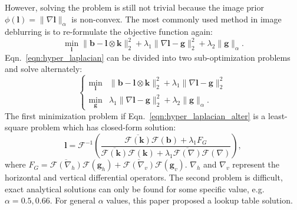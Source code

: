 \documentclass[journal, onecolumn, 10pt]{IEEEtran}
\begin{document}
However, solving the problem is still not trivial because the image prior $\phi(\mathbf{l}) = \|\nabla \mathbf{l}\|_{\alpha}$ is non-convex. The most commonly used method in image deblurring is to re-formulate the objective function again:
\begin{equation}
\min_{\mathbf{l}} \| \mathbf{b} - \mathbf{l} \otimes \mathbf{k} \|_2^2 + \lambda_1 \|\nabla \mathbf{l} - \mathbf{g}\|_2^2 + \lambda_2\|\mathbf{g}\|_{\alpha}.
\label{eqn:hyper_laplacian}
\end{equation}
Eqn.~\ref{eqn:hyper_laplacian} can be divided into two sub-optimization problems and solve alternately:
\begin{equation}
\begin{cases}
\min_{\mathbf{l}} &\| \mathbf{b} - \mathbf{l} \otimes \mathbf{k} \|_2^2 + \lambda_1 \|\nabla \mathbf{l} - \mathbf{g}\|_2^2 \\
\min_{\mathbf{g}} &\lambda_1\|\nabla \mathbf{l} - \mathbf{g}\|_2^2 + \lambda_2\|\mathbf{g}\|_{\alpha}.
\end{cases}
\label{eqn:hyper_laplacian_alter}
\end{equation}
The first minimization problem if Eqn.~\ref{eqn:hyper_laplacian_alter} is a least-square problem which has closed-form solution:
\begin{equation}
\mathbf{l} = \mathcal{F}^{-1} \left( \frac{\overline{\mathcal{F}(\mathbf{k})}\mathcal{F}(\mathbf{b}) + \lambda_1F_G}
{\overline{\mathcal{F}(\mathbf{k})}\mathcal{F}(\mathbf{k}) + \lambda_1\overline{\mathcal{F}(\nabla)}\mathcal{F}(\nabla)} \right),
\label{eqn:l2_latent_close_form}
\end{equation}
where $F_G = \overline{\mathcal{F}(\nabla_h)}\mathcal{F}(\mathbf{g}_h) + \overline{\mathcal{F}(\nabla_v)}\mathcal{F}(\mathbf{g}_v)$. $\nabla_h$ and $\nabla_v$ represent the horizontal and vertical differential operators.
The second problem is difficult, exact analytical solutions can only be found for some specific value, e.g. $\alpha = 0.5, 0.66$. For general $\alpha$ values, this paper proposed a lookup table solution.
\end{document}
